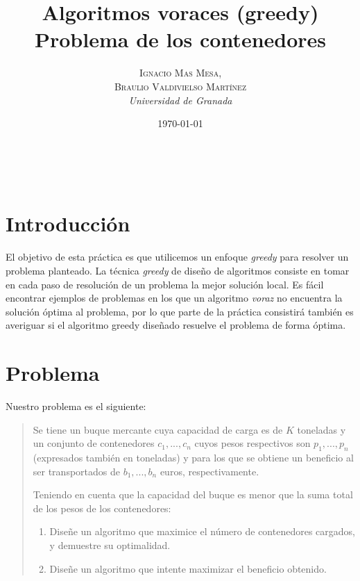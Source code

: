\documentclass[a4paper, 11pt]{article}
\title{\textbf{Algoritmos voraces (greedy)}\\ %
Problema de los contenedores} %
\author{\textsc{Ignacio Mas Mesa,\\Braulio Valdivielso Martínez} %
\\{\textit{Universidad de Granada}}} %
\date{\today} %
\makeatletter
\renewcommand{\maketitle}{
  \begin{flushright} %
  
  {\LARGE\@title} %
  
  \vspace{50pt} %
  
  {\large\@author} %
  \\\@date %
  \vspace{40pt} %
  \end{flushright}
}
\makeatother
\begin{document}
\maketitle %

\renewcommand{\abstractname}{Resumen} %



  \tableofcontents

\pagebreak


\section{Introducción}
El objetivo de esta práctica es que utilicemos un enfoque \textit{greedy} para resolver un problema planteado. La técnica \textit{greedy} de diseño de algoritmos consiste en tomar en cada paso de resolución de un problema la mejor solución local. Es fácil encontrar ejemplos de problemas en los que un algoritmo \textit{voraz} no encuentra la solución óptima al problema, por lo que parte de la práctica consistirá también es averiguar si el algoritmo greedy diseñado resuelve el problema de forma óptima.

\section{Problema}
Nuestro problema es el siguiente:
\begin{quote}
Se tiene un buque mercante cuya capacidad de carga es de $K$ toneladas y un conjunto de
contenedores $c_1, . . . , c_n$ cuyos pesos respectivos son $p_1, . . . , p_n$ (expresados también en toneladas) y para los que se obtiene un beneficio al ser transportados de $b_1, . . . , b_n$ euros, respectivamente.

Teniendo en cuenta que la capacidad del buque es menor que la suma total de los pesos de los
contenedores:
\begin{enumerate}
\item Diseñe un algoritmo que maximice el número de contenedores cargados, y demuestre su
optimalidad.
\item Diseñe un algoritmo que intente maximizar el beneficio obtenido.
\end{enumerate}
\end{quote}
\end{document}
